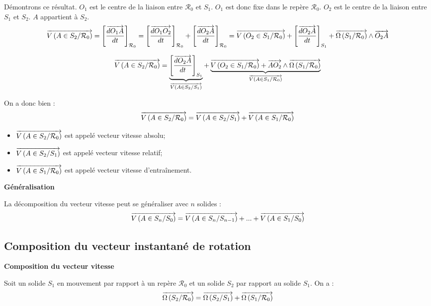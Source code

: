 \documentclass[10pt,oneside]{article}
\begin{document}
Démontrons ce résultat. $O_1$ est le centre de la liaison entre $\mathcal{R}_0$ et $S_1$. $O_1$ est donc fixe dans le repère $\mathcal{R}_0$. $O_2$ est le centre de la liaison entre $S_1$ et $S_2$. $A$ appartient à $S_2$. 
$$
\overrightarrow{V\left( {A} \in {S_2}/{\mathcal{R}_0}\right)}
= \left[\dfrac{\overrightarrow{dO_1 A}}{dt}
\right]_{\mathcal{R}_0}
= \left[\dfrac{\overrightarrow{dO_1 O_2}}{dt}
\right]_{\mathcal{R}_0}
+
\left[\dfrac{\overrightarrow{dO_2 A}}{dt}
\right]_{\mathcal{R}_0}
=
\overrightarrow{V\left( {O_2} \in {S_1}/{\mathcal{R}_0}\right)}
+
\left[\dfrac{\overrightarrow{dO_2 A}}{dt}\right]_{S_1}
+\overrightarrow{\Omega\left( {S_1}/{\mathcal{R}_0}\right)}\wedge \overrightarrow{O_2 A}
$$

$$
\overrightarrow{V\left( {A} \in {S_2}/{\mathcal{R}_0}\right)}
=
\underbrace{\left[\dfrac{\overrightarrow{dO_2 A}}{dt}\right]_{S_1}}_{\overrightarrow{V\left( {A} \in {S_2}/{S_1}\right)}}
+
\underbrace{\overrightarrow{V\left( {O_2} \in {S_1}/{\mathcal{R}_0}\right)}
+
\overrightarrow{AO_2}
\wedge 
\overrightarrow{\Omega\left( {S_1}/{\mathcal{R}_0}\right)}}_{\overrightarrow{V\left( {A} \in {S_1}/{\mathcal{R}_0}\right)}}
$$


On a donc bien : 
$$
\overrightarrow{V\left( {A} \in {S_2}/{\mathcal{R}_0}\right)}
=
\overrightarrow{V\left( {A} \in {S_2}/{S_1}\right)}
+
\overrightarrow{V\left( {A} \in {S_1}/{\mathcal{R}_0}\right)}
$$

\begin{rem}
\begin{itemize}
\item $\overrightarrow{V\left( {A} \in {S_2}/{\mathcal{R}_0}\right)}$ est appelé vecteur vitesse absolu;
\item $\overrightarrow{V\left( {A} \in {S_2}/{S_1}\right)}$ est appelé vecteur vitesse relatif; 
\item $\overrightarrow{V\left( {A} \in {S_1}/{\mathcal{R}_0}\right)}$ est appelé vecteur vitesse d'entraînement.
\end{itemize}
\end{rem}

\begin{resultat}
\textbf{Généralisation}

La décomposition du vecteur vitesse peut se généraliser avec $n$ solides : 
$$
\overrightarrow{V\left( {A} \in {S_n}/{S_0}\right)}
=
\overrightarrow{V\left( {A} \in {S_n}/{S_{n-1}}\right)}
+...+
\overrightarrow{V\left( {A} \in {S_1}/{S_0}\right)}
$$

\end{resultat}

\subsection{Composition du vecteur instantané de rotation}
\begin{resultat}
\textbf{Composition du vecteur vitesse}

Soit un solide $S_1$ en mouvement par rapport à un repère $\mathcal{R}_0$ et un solide $S_2$ par rapport au solide $S_1$. On a : 
$$
\overrightarrow{\Omega\left( {S_2}/{\mathcal{R}_0}\right)}=
\overrightarrow{\Omega\left( {S_2}/{S_1}\right)}+\overrightarrow{\Omega\left( {S_1}/{\mathcal{R}_0}\right)}
$$
\end{resultat}
\end{document}
